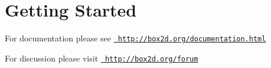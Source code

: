 \hypertarget{index_intro_sec}{}\section{Getting Started}\label{index_intro_sec}
For documentation please see \href{http://box2d.org/documentation.html}{\texttt{ http\+://box2d.\+org/documentation.\+html}}

For discussion please visit \href{http://box2d.org/forum}{\texttt{ http\+://box2d.\+org/forum}} 